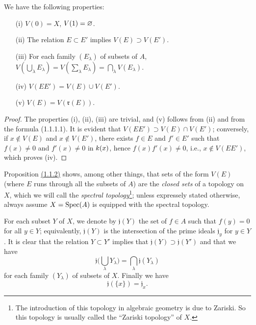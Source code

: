 \begin{prop}[1.1.2]
\label{prop-1.1.1.2}
We have the following properties:
\begin{itemize}
  \item[{\rm(i)}] $V(0)=X$, $V(1)=\varnothing$.
  \item[{\rm(ii)}] The relation $E\subset E'$ implies $V(E)\supset V(E')$.
  \item[{\rm(iii)}] For each family $(E_\lambda)$ of subsets of $A$,
        $V(\bigcup_\lambda E_\lambda)=V(\sum_\lambda E_\lambda)
          =\bigcap_\lambda V(E_\lambda)$.
  \item[{\rm(iv)}] $V(EE')=V(E)\cup V(E')$.
  \item[{\rm(v)}] $V(E)=V(\mathfrak{r}(E))$.
\end{itemize}
\end{prop}

\begin{proof}
\label{proof-prop-1.1.1.2}
The properties (i), (ii), (iii) are trivial, and (v) follows from (ii) and from
the formula (1.1.1.1). It is evident that $V(EE')\supset V(E)\cap V(E')$;
conversely, if $x\not\in V(E)$ and $x\not\in V(E')$, there exists $f\in E$ and
$f'\in E'$ such that $f(x)\neq 0$ and $f'(x)\neq 0$ in $k(x)$, hence
$f(x)f'(x)\neq 0$, i.e., $x\not\in V(EE')$, which proves (iv).
\end{proof}

\begin{rmk}
\label{rmk-prop-1.1.1.2}
Proposition \hyperref[prop-1.1.1.2]{(1.1.2)} shows, among other things, that sets of the form $V(E)$
(where $E$ runs through all the subsets of $A$) are the {\it closed sets} of a topology on
$X$, which we will call the {\it spectral topology}\footnote{The introduction of this
topology in algebraic geometry is due to Zariski. So this topology is usually called
the ``Zariski topology'' of $X$.}; unless expressely stated otherwise, always assume
$X={\mathop{\mathrm{Spec}}\nolimits}(A)$ is equipped with the spectral topology.
\end{rmk}

\begin{env}[1.1.3]
\label{env-1.1.1.3}
For each subset $Y$ of $X$, we denote by $\mathfrak{j}(Y)$ the set of $f\in A$ such that
$f(y)=0$ for all $y\in Y$; equivalently, $\mathfrak{j}(Y)$ is the intersection of the prime
ideals $\mathfrak{j}_y$ for $y\in Y$. It is clear that the relation $Y\subset Y'$ implies
that $\mathfrak{j}(Y)\supset\mathfrak{j}(Y')$ and that we have
\[
  \mathfrak{j}\bigg(\bigcup_\lambda Y_\lambda\bigg)=\bigcap_\lambda\mathfrak{j}(Y_\lambda)
  \tag{1.1.3.1}
\]
for each family $(Y_\lambda)$ of subsets of $X$. Finally we have
\[
  \mathfrak{j}(\{x\})=\mathfrak{j}_x.
  \tag{1.1.3.2}
\]
\end{env}

